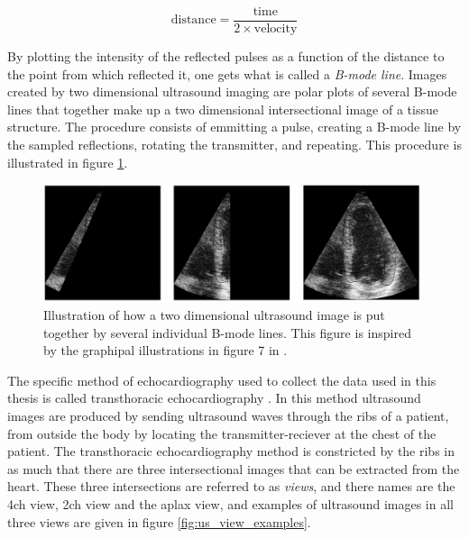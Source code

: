 \begin{equation}
    \mathrm{distance} = \frac{\mathrm{time}}{2 \times \mathrm{velocity}}
    \label{eq:dist}
\end{equation}

By plotting the intensity of the reflected pulses as a function of the distance to the point from which reflected it, one gets what is called a \textit{B-mode line}. Images created by two dimensional ultrasound imaging are polar plots of several B-mode lines that together make up a two dimensional intersectional image of a tissue structure. The procedure consists of emmitting a pulse, creating a B-mode line by the sampled reflections, rotating the transmitter, and repeating. This procedure is illustrated in figure \ref{fig:b_mode_search}.

\begin{figure}[H]
    \centering
    \includegraphics[width=0.99\textwidth]{echocardiography/b_mode_search.png}
    \caption{Illustration of how a two dimensional ultrasound image is put together by several individual B-mode lines. This figure is inspired by the graphipal illustrations in figure 7 in \cite{basic_ultrasound}.}
    \label{fig:b_mode_search}
\end{figure}

The specific method of echocardiography used to collect the data used in this thesis is called transthoracic echocardiography \cite{echocardiography_wikipedia}. In this method ultrasound images are produced by sending ultrasound waves through the ribs of a patient, from outside the body by locating the transmitter-reciever at the chest of the patient. The transthoracic echocardiography method is constricted by the ribs in as much that there are three intersectional images that can be extracted from the heart. These three intersections are referred to as \textit{views}, and there names are the \acrfull{4ch} view, \acrfull{2ch} view and the \acrfull{aplax} view, and examples of ultrasound images in all three views are given in figure \ref{fig:us_view_examples}.

